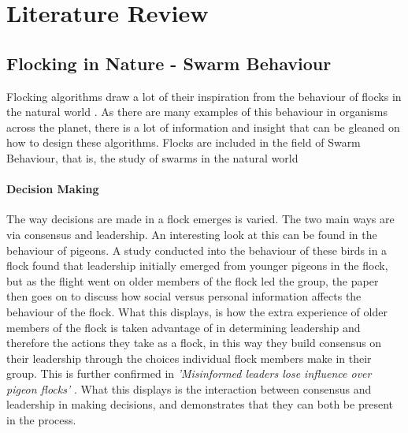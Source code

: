 


\section{Literature Review}

\subsection{Flocking in Nature - Swarm Behaviour}
Flocking algorithms draw a lot of their inspiration from the behaviour of flocks in the natural world \citep{flake1998computational}. As there are many examples of this behaviour in organisms across the planet, there is a lot of information and insight that can be gleaned on how to design these algorithms. Flocks are included in the field of Swarm Behaviour, that is, the study of swarms in the natural world 

	\paragraph{Decision Making}
	The way decisions are made in a flock emerges is varied. The two main ways are via consensus and leadership. An interesting look at this can be found in the behaviour of pigeons. A study conducted into the behaviour of these birds in a flock \citep{Jorge2414} found that leadership initially emerged from younger pigeons in the flock, but as the flight went on older members of the flock led the group, the paper then goes on to discuss how social versus personal information affects the behaviour of the flock. What this displays, is how the extra experience of older members of the flock is taken advantage of in determining leadership and therefore the actions they take as a flock, in this way they build consensus on their leadership through the choices individual flock members make in their group. This is further confirmed in \textit{ 'Misinformed leaders lose influence over pigeon flocks' }\citet{doi:10.1098/rsbl.2016.0544}. What this displays is the interaction between consensus and leadership in making decisions, and demonstrates that they can both be present in the process.
	
